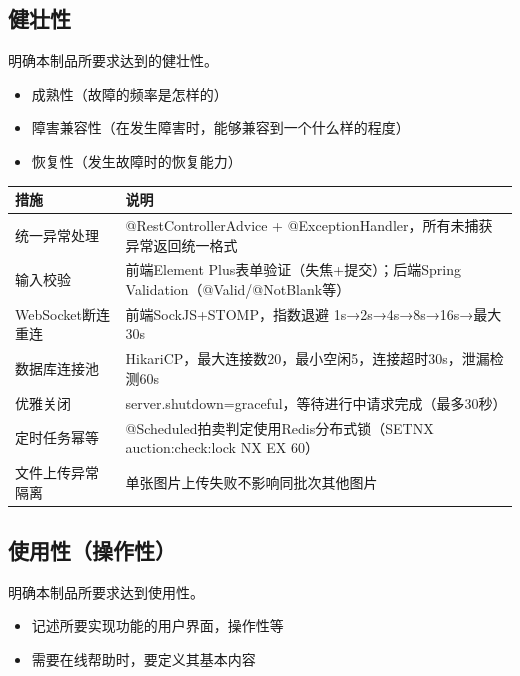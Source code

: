 \documentclass[12pt,a4paper]{ctexart}
\numberwithin{figure}{section}
\numberwithin{table}{section}
\begin{document}
\subsection{健壮性}

明确本制品所要求达到的健壮性。

\begin{itemize}
    \item 成熟性（故障的频率是怎样的）
    \item 障害兼容性（在发生障害时，能够兼容到一个什么样的程度）
    \item 恢复性（发生故障时的恢复能力）
\end{itemize}

\begin{center}
\renewcommand{\arraystretch}{1.3}
\begin{tabular}{|p{4cm}|p{10cm}|}
\hline
\rowcolor{tableheader}
\textbf{措施} & \textbf{说明} \\
\hline
统一异常处理 & @RestControllerAdvice + @ExceptionHandler，所有未捕获异常返回统一格式 \\
\hline
输入校验 & 前端Element Plus表单验证（失焦+提交）；后端Spring Validation（@Valid/@NotBlank等） \\
\hline
WebSocket断连重连 & 前端SockJS+STOMP，指数退避 1s→2s→4s→8s→16s→最大30s \\
\hline
数据库连接池 & HikariCP，最大连接数20，最小空闲5，连接超时30s，泄漏检测60s \\
\hline
优雅关闭 & server.shutdown=graceful，等待进行中请求完成（最多30秒） \\
\hline
定时任务幂等 & @Scheduled拍卖判定使用Redis分布式锁（SETNX auction:check:lock NX EX 60） \\
\hline
文件上传异常隔离 & 单张图片上传失败不影响同批次其他图片 \\
\hline
\end{tabular}
\end{center}

\subsection{使用性（操作性）}

明确本制品所要求达到使用性。

\begin{itemize}
    \item 记述所要实现功能的用户界面，操作性等
    \item 需要在线帮助时，要定义其基本内容
\end{itemize}
\end{document}
